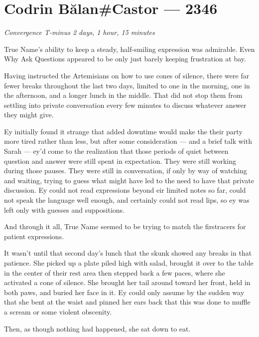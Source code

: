 \hypertarget{codrin-bux103lancastor-2346}{%
\chapter{Codrin Bălan\#Castor — 2346}\label{codrin-bux103lancastor-2346}}

\begin{center}
\emph{Convergence T-minus 2 days, 1 hour, 15 minutes}
\end{center}

\noindent True Name's ability to keep a steady, half-smiling expression was admirable. Even Why Ask Questions appeared to be only just barely keeping frustration at bay.

Having instructed the Artemisians on how to use cones of silence, there were far fewer breaks throughout the last two days, limited to one in the morning, one in the afternoon, and a longer lunch in the middle. That did not stop them from settling into private conversation every few minutes to discuss whatever answer they might give.

Ey initially found it strange that added downtime would make the their party more tired rather than less, but after some consideration — and a brief talk with Sarah — ey'd come to the realization that those periods of quiet between question and answer were still spent in expectation. They were still working during those pauses. They were still in conversation, if only by way of watching and waiting, trying to guess what might have led to the need to have that private discussion. Ey could not read expressions beyond eir limited notes so far, could not speak the language well enough, and certainly could not read lips, so ey was left only with guesses and suppositions.

And through it all, True Name seemed to be trying to match the firstracers for patient expressions.

It wasn't until that second day's lunch that the skunk showed any breaks in that patience. She picked up a plate piled high with salad, brought it over to the table in the center of their rest area then stepped back a few paces, where she activated a cone of silence. She brought her tail around toward her front, held in both paws, and buried her face in it. Ey could only assume by the sudden way that she bent at the waist and pinned her ears back that this was done to muffle a scream or some violent obscenity.

Then, as though nothing had happened, she sat down to eat.

